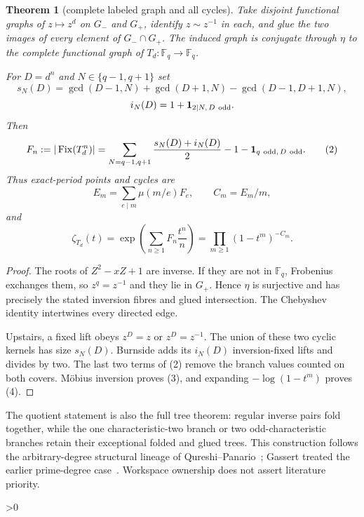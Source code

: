 \documentclass[10pt]{article}
\newtheorem{theorem}{Theorem}
\providecommand{\CRevisionRound}{2}
\newcommand{\Fq}{\mathbb F_q}
\newcommand{\Fix}{\operatorname{Fix}}
\newcommand{\ind}{\mathbf 1}
\begin{document}
\begin{theorem}[complete labeled graph and all cycles]
Take disjoint functional graphs of $z\mapsto z^d$ on $G_-$ and $G_+$,
identify $z\sim z^{-1}$ in each, and glue the two images of every element of
$G_-\cap G_+$.  The induced graph is conjugate through $\eta$ to the complete
functional graph of $T_d:\Fq\to\Fq$.

For $D=d^n$ and $N\in\{q-1,q+1\}$ set
\[
 s_N(D)=\gcd(D-1,N)+\gcd(D+1,N)-\gcd(D-1,D+1,N),
\]
\[
 i_N(D)=1+\ind_{2\mid N,\,D\ {\rm odd}}.
\]
Then
\begin{equation}
 F_n:=|\Fix(T_d^n)|=\sum_{N=q-1,q+1}\frac{s_N(D)+i_N(D)}2
 -1-\ind_{q\ {\rm odd},\,D\ {\rm odd}}.                  \tag{2}
\end{equation}
Thus exact-period points and cycles are
\begin{equation}
 E_m=\sum_{e\mid m}\mu(m/e)F_e,\qquad C_m=E_m/m,          \tag{3}
\end{equation}
and
\begin{equation}
 \zeta_{T_d}(t)=\exp\!\left(\sum_{n\geq1}F_n\frac{t^n}{n}\right)
 =\prod_{m\geq1}(1-t^m)^{-C_m}.                           \tag{4}
\end{equation}
\end{theorem}
\begin{proof}
The roots of $Z^2-xZ+1$ are inverse.  If they are not in $\Fq$, Frobenius
exchanges them, so $z^q=z^{-1}$ and they lie in $G_+$.  Hence $\eta$ is
surjective and has precisely the stated inversion fibres and glued
intersection.  The Chebyshev identity intertwines every directed edge.

Upstairs, a fixed lift obeys $z^D=z$ or $z^D=z^{-1}$.  The union of these
two cyclic kernels has size $s_N(D)$.  Burnside adds its $i_N(D)$
inversion-fixed lifts and divides by two.  The last two terms of (2) remove
the branch values counted on both covers.  M\"obius inversion proves (3),
and expanding $-\log(1-t^m)$ proves (4).
\end{proof}

The quotient statement is also the full tree theorem: regular inverse pairs
fold together, while the one characteristic-two branch or two
odd-characteristic branches retain their exceptional folded and glued trees.
This construction follows the arbitrary-degree structural lineage of
Qureshi--Panario~\cite{QP}; Gassert treated the earlier prime-degree
case~\cite{Gassert}.  Workspace ownership does not assert literature priority.

\ifnum\CRevisionRound>0
\end{document}
